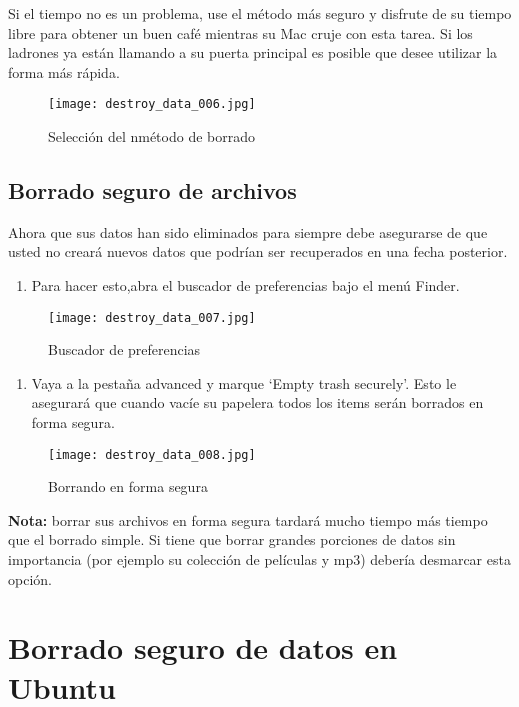 \documentclass[10pt,a5paper,twoside,,]{book}
\providecommand{\tightlist}{%
  \setlength{\itemsep}{0pt}\setlength{\parskip}{0pt}}
\begin{document}
Si el tiempo no es un problema, use el método más seguro y disfrute de
su tiempo libre para obtener un buen café mientras su Mac cruje con esta
tarea. Si los ladrones ya están llamando a su puerta principal es
posible que desee utilizar la forma más rápida.

\begin{figure}[htbp]
\centering
\texttt{[image: destroy\_data\_006.jpg]}
\caption{Selección del nmétodo de borrado}
\end{figure}

\subsection{Borrado seguro de
archivos}\label{borrado-seguro-de-archivos}

Ahora que sus datos han sido eliminados para siempre debe asegurarse de
que usted no creará nuevos datos que podrían ser recuperados en una
fecha posterior.

\begin{enumerate}
\def\labelenumi{\arabic{enumi}.}
\tightlist
\item
  Para hacer esto,abra el buscador de preferencias bajo el menú Finder.
\end{enumerate}

\begin{figure}[htbp]
\centering
\texttt{[image: destroy\_data\_007.jpg]}
\caption{Buscador de preferencias}
\end{figure}

\begin{enumerate}
\def\labelenumi{\arabic{enumi}.}
\setcounter{enumi}{1}
\tightlist
\item
  Vaya a la pestaña advanced y marque `Empty trash securely'. Esto le
  asegurará que cuando vacíe su papelera todos los items serán borrados
  en forma segura.
\end{enumerate}

\begin{figure}[htbp]
\centering
\texttt{[image: destroy\_data\_008.jpg]}
\caption{Borrando en forma segura}
\end{figure}

\textbf{Nota:} borrar sus archivos en forma segura tardará mucho tiempo
más tiempo que el borrado simple. Si tiene que borrar grandes porciones
de datos sin importancia (por ejemplo su colección de películas y mp3)
debería desmarcar esta opción.

\section{Borrado seguro de datos en
Ubuntu}\label{borrado-seguro-de-datos-en-ubuntu}
\end{document}
